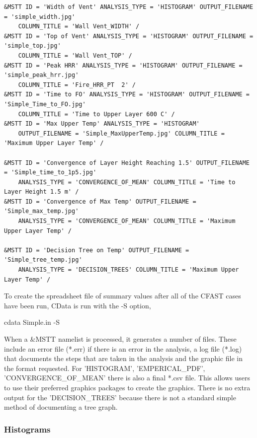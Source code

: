 \documentclass[12pt,twoside]{book}
\begin{document}
\begin{lstlisting}[basicstyle=\scriptsize]
&MSTT ID = 'Width of Vent' ANALYSIS_TYPE = 'HISTOGRAM' OUTPUT_FILENAME = 'simple_width.jpg'
	COLUMN_TITLE = 'Wall Vent_WIDTH' /
&MSTT ID = 'Top of Vent' ANALYSIS_TYPE = 'HISTOGRAM' OUTPUT_FILENAME = 'simple_top.jpg'
	COLUMN_TITLE = 'Wall Vent_TOP' /
&MSTT ID = 'Peak HRR' ANALYSIS_TYPE = 'HISTOGRAM' OUTPUT_FILENAME = 'simple_peak_hrr.jpg'
	COLUMN_TITLE = 'Fire_HRR_PT  2' /
&MSTT ID = 'Time to FO' ANALYSIS_TYPE = 'HISTOGRAM' OUTPUT_FILENAME = 'Simple_Time_to_FO.jpg'
	COLUMN_TITLE = 'Time to Upper Layer 600 C' /
&MSTT ID = 'Max Upper Temp' ANALYSIS_TYPE = 'HISTOGRAM'
	OUTPUT_FILENAME = 'Simple_MaxUpperTemp.jpg' COLUMN_TITLE = 'Maximum Upper Layer Temp' /

&MSTT ID = 'Convergence of Layer Height Reaching 1.5' OUTPUT_FILENAME = 'Simple_time_to_1p5.jpg'
	ANALYSIS_TYPE = 'CONVERGENCE_OF_MEAN' COLUMN_TITLE = 'Time to Layer Height 1.5 m' /
&MSTT ID = 'Convergence of Max Temp' OUTPUT_FILENAME = 'Simple_max_temp.jpg'
	ANALYSIS_TYPE = 'CONVERGENCE_OF_MEAN' COLUMN_TITLE = 'Maximum Upper Layer Temp' /

&MSTT ID = 'Decision Tree on Temp' OUTPUT_FILENAME = 'Simple_tree_temp.jpg'
	ANALYSIS_TYPE = 'DECISION_TREES' COLUMN_TITLE = 'Maximum Upper Layer Temp' /
\end{lstlisting}

To create the spreadsheet file of summary values after all of the CFAST cases have been run, CData is run with the {\ct -S} option,

\vspace{\baselineskip}
{\ct cdata Simple.in -S}
\vspace{\baselineskip}

When a {\ct \&MSTT} namelist is processed, it generates a number of files. These include an error file (*.err) if there is an error in the analysis, a log file (*.log) that documents the steps that are taken in the analysis and the graphic file in the format requested. For {\ct 'HISTOGRAM'}, {\ct 'EMPERICAL\_PDF'}, {\ct 'CONVERGENCE\_OF\_MEAN'} there is also a final *.csv file. This allows users to use their preferred graphics packages to create the graphics. There is no extra output for the {\ct 'DECISION\_TREES'} because there is not a standard simple method of documenting a tree graph.

\subsubsection{Histograms}
\end{document}
